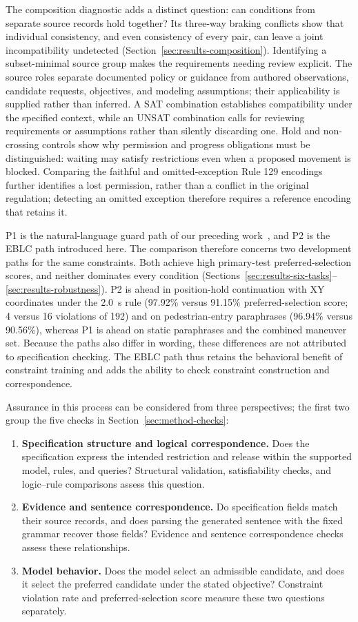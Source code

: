 The composition diagnostic adds a distinct question: can conditions from
separate source records hold together? Its three-way braking conflicts show
that individual consistency, and even consistency of every pair, can leave a
joint incompatibility undetected (Section~\ref{sec:results-composition}).
Identifying a subset-minimal source group makes the requirements needing
review explicit. The source roles separate documented policy or guidance from authored
observations, candidate requests, objectives, and modeling assumptions;
their applicability is supplied rather than inferred. A SAT combination establishes compatibility under the specified
context, while an UNSAT combination calls for reviewing requirements or
assumptions rather than silently discarding one. Hold and non-crossing controls show why permission and progress obligations
must be distinguished: waiting may satisfy restrictions even when a proposed
movement is blocked. Comparing the faithful and omitted-exception Rule 129
encodings further identifies a lost permission, rather than a conflict in the
original regulation; detecting an omitted exception therefore requires a
reference encoding that retains it.

P1 is the natural-language guard path of our preceding work~\cite{r4}, and P2
is the EBLC path introduced here. The comparison therefore concerns two
development paths for the same constraints. Both achieve high primary-test
preferred-selection scores, and neither dominates every condition
(Sections~\ref{sec:results-six-tasks}--\ref{sec:results-robustness}). P2 is
ahead in position-hold continuation with XY coordinates under the 2.0~s rule
(97.92\% versus 91.15\% preferred-selection score; 4 versus 16 violations of 192) and on
pedestrian-entry paraphrases (96.94\% versus 90.56\%), whereas P1 is ahead on
static paraphrases and the combined maneuver set. Because the paths also differ
in wording, these differences are not attributed to specification checking. The EBLC path
thus retains the behavioral benefit of constraint training and adds the ability
to check constraint construction and correspondence.

Assurance in this process can be considered from three perspectives; the
first two group the five checks in Section~\ref{sec:method-checks}:
\begin{enumerate}
\item \textbf{Specification structure and logical correspondence.} Does the
specification express the intended restriction and release within the supported
model, rules, and queries? Structural validation, satisfiability checks, and
logic--rule comparisons assess this question.
\item \textbf{Evidence and sentence correspondence.} Do specification fields
match their source records, and does parsing the generated sentence with the
fixed grammar recover those fields? Evidence and sentence correspondence
checks assess these relationships.
\item \textbf{Model behavior.} Does the model select an admissible candidate,
and does it select the preferred candidate under the stated objective?
Constraint violation rate and preferred-selection score measure these two
questions separately.
\end{enumerate}

